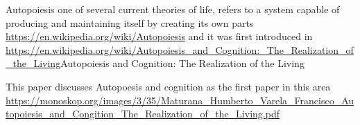 \documentclass[a4paper]{article}
\title{}
\date{}
\begin{document}
    \maketitle
    Autopoiesis one of several current theories of life, refers to a system capable of producing and maintaining itself by creating its own parts
    \url{https://en.wikipedia.org/wiki/Autopoiesis}
    and it was first introduced in \url{https://en.wikipedia.org/wiki/Autopoiesis_and_Cognition:_The_Realization_of_the_Living}{Autopoiesis and Cognition: The Realization of the Living}
    
    This paper discusses Autopoesis and cognition as the first paper in this area
    \url{https://monoskop.org/images/3/35/Maturana_Humberto_Varela_Francisco_Autopoiesis_and_Congition_The_Realization_of_the_Living.pdf}
\end{document}
